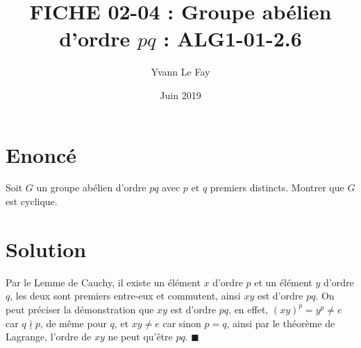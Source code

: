 \documentclass{article}
\newcommand*{\QED}{\hfill\ensuremath{\blacksquare}}%
\begin{document}
\title{FICHE 02-04 : Groupe abélien d'ordre $pq$ : ALG1-01-2.6}
\author{Yvann Le Fay}
\date{Juin 2019}
\maketitle
\section*{Enoncé}
Soit $G$ un groupe abélien d'ordre $pq$ avec $p$ et $q$ premiers distincts. Montrer que $G$ est cyclique.
\section*{Solution}
Par le Lemme de Cauchy, il existe un élément $x$ d'ordre $p$ et un élément $y$ d'ordre $q$, les deux sont premiers entre-eux et commutent, ainsi $xy$ est d'ordre $pq$.
On peut préciser la démonstration que $xy$ est d'ordre $pq$, en effet, $(xy)^p = y^p \neq e$ car $q\nmid p$, de même pour $q$, et $xy\neq e$ car sinon $p=q$, ainsi par le théorème de Lagrange, l'ordre de $xy$ ne peut qu'être $pq$.
\QED
\end{document}
